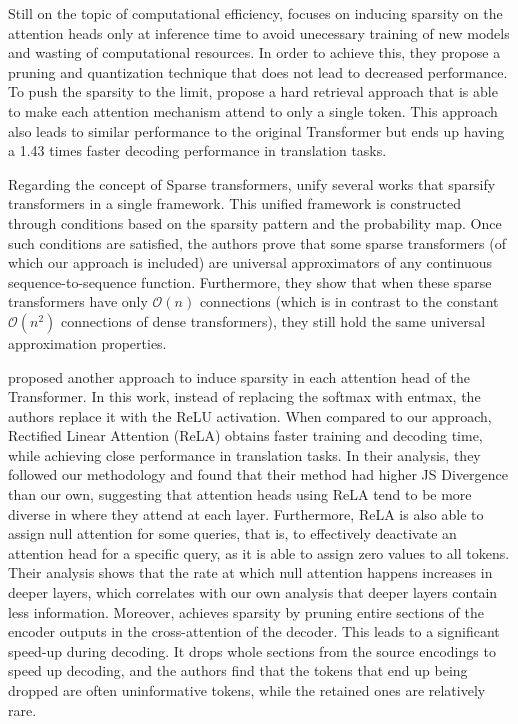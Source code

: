 Still on the topic of computational efficiency,
\citet{ji2021DistributionSparsityInferencetime} focuses on inducing
sparsity on the attention heads only at inference time to avoid
unecessary training of new models and wasting of computational
resources. In order to achieve this, they propose a pruning and
quantization technique that does not lead to decreased performance.
To push the sparsity to the limit,
\citet{xu2021LearningHardRetrieval} propose a hard retrieval approach
that is able to make each attention mechanism attend to only a single
token. This approach also leads to similar performance to the
original Transformer but ends up having a 1.43 times faster decoding
performance in translation tasks.

Regarding the concept of Sparse transformers,
\citet{yun2020ConnectionsareExpressive} unify several works that
sparsify transformers in a single framework.
This unified framework is constructed through conditions based on the
sparsity pattern and the probability map. Once such conditions are
satisfied, the authors prove that some sparse transformers (of which
our approach is included) are universal approximators of any
continuous sequence-to-sequence function. Furthermore, they show that
when these sparse transformers have only $\mathcal{O}(n)$ connections (which is
in contrast to the constant $\mathcal{O}(n^2)$ connections of dense
transformers), they still hold the same universal approximation
properties.

\citet{zhang2021SparseAttentionLinear} proposed another approach to
induce sparsity in each attention head of the Transformer. In this
work, instead of replacing the softmax with entmax, the authors
replace it with the ReLU activation. When compared to our approach,
Rectified Linear Attention (ReLA) obtains faster training and
decoding time, while achieving close performance in translation
tasks. In their analysis, they followed our methodology and found
that their method had higher JS Divergence than our own, suggesting
that attention heads using ReLA tend to be more diverse in where they
attend at each layer. Furthermore, ReLA is also able to assign null
attention for some queries, that is, to effectively deactivate an
attention head for a specific query, as it is able to assign zero
values to all tokens. Their analysis shows that the rate at which
null attention happens increases in deeper layers, which correlates
with our own analysis that deeper layers contain less information.
Moreover, \citet{zhang2021SparsifyingEncoderOutputs} achieves
sparsity by pruning entire sections of the encoder outputs in the
cross-attention of the decoder. This leads to a significant speed-up
during decoding. It drops whole sections from the source encodings to
speed up decoding, and the authors find that the tokens that end up
being dropped are often uninformative tokens, while the retained ones
are relatively rare.

